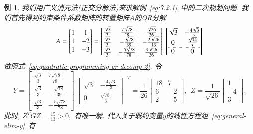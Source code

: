 \documentclass{SBCbookchapter}
\newtheorem{eg}[thm]{例}
\numberwithin{equation}{section}
\begin{document}
\begin{eg}
\label{eg:7.2.2}
我们用广义消元法(正交分解法)来求解例~\eqref{eg:7.2.1}~中的二次规划问题. 我们首先得到约束条件系数矩阵的转置矩阵$A$的QR分解
\begin{equation*}
A = \begin{bmatrix} 1 & 1 \\ 1 & -2 \\ 1 & -3 \end{bmatrix} = \left[\begin{array}{@{}cc:c@{}} \frac{\sqrt{3}}{3} & \frac{7 \sqrt{78}}{78} & \frac{\sqrt{26}}{26} \\ \frac{\sqrt{3}}{3} & - \frac{\sqrt{78}}{39} & - \frac{2 \sqrt{26}}{13} \\ \frac{\sqrt{3}}{3} & - \frac{5 \sqrt{78}}{78} & \frac{3 \sqrt{26}}{26} \end{array}\right] ~ \left[\begin{array}{@{}cc@{}} \sqrt{3} & - \frac{4 \sqrt{3}}{3} \\ 0 & \frac{\sqrt{78}}{3} \\ \hdashline 0 & 0 \end{array}\right]
\end{equation*}
依照式~\eqref{eq:quadratic-programming-qr-decomp-2}, 令
\begin{equation*}
Y = \left[\begin{matrix} \frac{\sqrt{3}}{3} & \frac{7 \sqrt{78}}{78} \\ \frac{\sqrt{3}}{3} & - \frac{\sqrt{78}}{39} \\ \frac{\sqrt{3}}{3} & - \frac{5 \sqrt{78}}{78} \end{matrix}\right] ~ \left[\begin{matrix} \sqrt{3} & - \frac{4 \sqrt{3}}{3} \\ 0 & \frac{\sqrt{78}}{3} \end{matrix}\right]^{-T} = \frac{1}{26} \left[\begin{matrix} 18 & 7 \\ 6 & -2 \\ 2 & -5 \end{matrix}\right], ~~ Z = \frac{1}{\sqrt{26}} \left[\begin{matrix} 1 \\ -4 \\ 3 \end{matrix}\right].
\end{equation*}
此时, $Z^T G Z = \frac{15}{13} > 0,$ 有唯一解. 代入关于既约变量$y$的线性方程组~\eqref{eq:general-elim-y}~有
\begin{equation*}

\end{equation*}
\end{eg}
\end{document}
